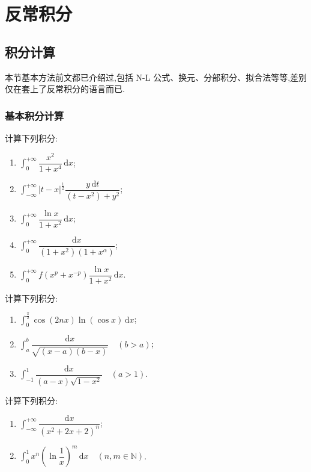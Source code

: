 \documentclass[../../数学分析培优讲义.tex]{subfiles}
\begin{document}
\setcounter{chapter}{6}
\pagestyle{fancy}

\chapter{反常积分}


\section{积分计算}

本节基本方法前文都已介绍过,包括 N-L 公式、换元、分部积分、拟合法等等,差别仅在套上了反常积分的语言而已.



\subsection{基本积分计算}

\begin{example}
计算下列积分:
\begin{enumerate}[label=(\arabic*)]
    \item $\displaystyle\int_0^{+\infty}\dfrac{x^2}{1+x^4}\,\mathrm{d}x$;
    \item $\displaystyle\int_{-\infty}^{+\infty}|t-x|^{\frac{1}{2}}
    \dfrac{y\,\mathrm{d}t}{(t-x^2)+y^2}$;
    \item $\displaystyle\int_0^{+\infty}\dfrac{\ln x}{1+x^2}\,\mathrm{d}x$;
    \item $\displaystyle\int_0^{+\infty}\dfrac{\mathrm{d}x}{(1+x^2)(1+x^\alpha)}$;
    \item $\displaystyle\int_0^{+\infty}f(x^p+x^{-p})\dfrac{\ln x}{1+x^2}\,\mathrm{d}x$.
\end{enumerate}
\end{example}
\exampleblank

\begin{example}
计算下列积分:
\begin{enumerate}[label=(\arabic*)]
    \item $\displaystyle\int_0^{\frac{\pi}{2}}\cos(2nx)\ln(\cos x)\,\mathrm{d}x$;
    \item $\displaystyle\int_a^b\dfrac{\mathrm{d}x}{\sqrt{(x-a)(b-x)}}\quad(b>a)$;
    \item $\displaystyle\int_{-1}^{1}\dfrac{\mathrm{d}x}{(a-x)\sqrt{1-x^2}}\quad(a>1)$.
\end{enumerate}
\end{example}
\exampleblank

\begin{example}
计算下列积分:
\begin{enumerate}[label=(\arabic*)]
    \item $\displaystyle\int_{-\infty}^{+\infty}\dfrac{\mathrm{d}x}{(x^2+2x+2)^n}$;
    \item $\displaystyle\int_0^1x^n\left(\ln\dfrac{1}{x}\right)^m\,\mathrm{d}x\quad(n,m\in\mathbb{N})$.
\end{enumerate}
\end{example}
\exampleblank
\end{document}
